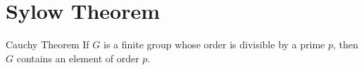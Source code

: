 \chapter{Sylow Theorem}\label{chp:2_3}

\begin{theorem}{Cauchy Theorem}{}
    If $G$ is a finite group whose order is divisible by a prime $p$, 
    then $G$ contains an element of order $p$.
\end{theorem}


